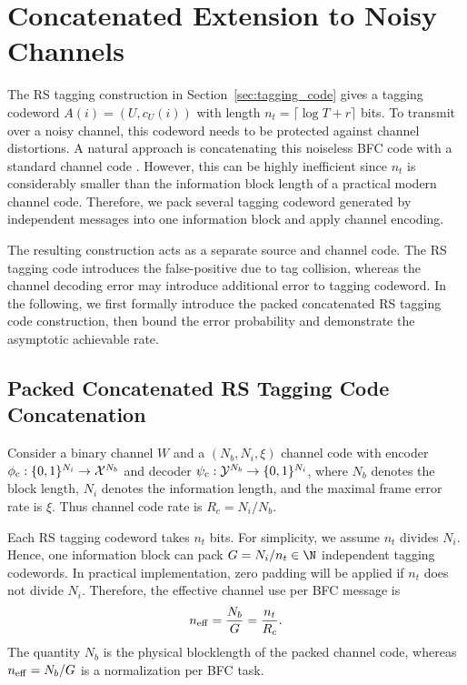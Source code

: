 \section{Concatenated Extension to Noisy Channels}
\label{sec:noisy}
The RS tagging construction in Section~\ref{sec:tagging_code} gives a tagging codeword $A(i)=(U,c_U(i))$ with length $n_t=\lceil\log T + r\rceil$ bits. To transmit over a noisy channel, this codeword needs to be protected against channel distortions. A natural approach is concatenating this noiseless BFC code with a standard channel code \cite{RS-tagging}. However, this can be highly inefficient since $n_t$ is considerably smaller than the information block length of a practical modern channel code. Therefore, we pack several tagging codeword generated by independent messages into one information block and apply channel encoding.

The resulting construction acts as a separate source and channel code. The RS tagging code introduces the false-positive due to tag collision, whereas the channel decoding error may introduce additional error to tagging codeword. In the following, we first formally introduce the packed concatenated RS tagging code construction, then bound the error probability and demonstrate the asymptotic achievable rate.


\subsection{Packed Concatenated RS Tagging Code Concatenation}
\label{sec:packing_concatenation}
Consider a binary channel $W$ and a $(N_b,N_i,\xi)$ channel code with encoder $\phi_{\rm c}:\{0,1\}^{N_i}\to\mathcal{X}^{N_b}$ and decoder $\psi_{\rm c}:\mathcal{Y}^{N_b}\to\{0,1\}^{N_i}$, where $N_b$ denotes the block length, $N_i$ denotes the information length, and the maximal frame error rate is $\xi$. Thus channel code rate is $R_c = N_i/N_b$.


Each RS tagging codeword takes $n_t$ bits. For simplicity, we assume $n_t$ divides $N_i$. Hence, one information block can pack $G=N_i/n_t\in\N$ independent tagging codewords. In practical implementation, zero padding will be applied if $n_t$ does not divide $N_i$. Therefore, the effective channel use per BFC message is
\begin{equation}
    n_{\rm eff} = \frac{N_b}{G}=\frac{n_t}{R_c}.
\end{equation}
The quantity $N_b$ is the physical blocklength of the packed channel code, whereas $n_{\rm eff}=N_b/G$ is a normalization per BFC task.

